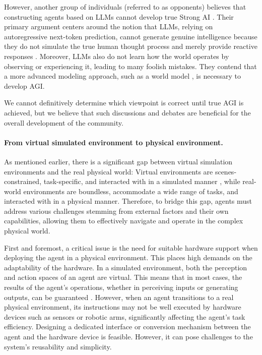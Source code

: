 However, another group of individuals (referred to as opponents) believes that constructing agents based on LLMs cannot develop true Strong AI \cite{twitter_2}. 
Their primary argument centers around the notion that LLMs, relying on autoregressive next-token prediction, cannot generate genuine intelligence because they do not simulate the true human thought process and merely provide reactive responses \cite{blog_1}. 
Moreover, LLMs also do not learn how the world operates by observing or experiencing it, leading to many foolish mistakes. They contend that a more advanced modeling approach, such as a world model \cite{lecun2022path}, is necessary to develop AGI.

We cannot definitively determine which viewpoint is correct until true AGI is achieved, but we believe that such discussions and debates are beneficial for the overall development of the community.



\paragraph{From virtual simulated environment to physical environment.}
As mentioned earlier, there is a significant gap between virtual simulation environments and the real physical world: Virtual environments are scenes-constrained, task-specific, and interacted with in a simulated manner \cite{DBLP:journals/corr/abs-2307-13854, DBLP:conf/iclr/ShridharYCBTH21}, while real-world environments are boundless, accommodate a wide range of tasks, and interacted with in a physical manner. Therefore, to bridge this gap, agents must address various challenges stemming from external factors and their own capabilities, allowing them to effectively navigate and operate in the complex physical world.

First and foremost, a critical issue is the need for suitable hardware support when deploying the agent in a physical environment. This places high demands on the adaptability of the hardware. In a simulated environment, both the perception and action spaces of an agent are virtual. This means that in most cases, the results of the agent's operations, whether in perceiving inputs or generating outputs, can be guaranteed \cite{DBLP:journals/corr/abs-2308-01552}. However, when an agent transitions to a real physical environment, its instructions may not be well executed by hardware devices such as sensors or robotic arms, significantly affecting the agent's task efficiency. Designing a dedicated interface or conversion mechanism between the agent and the hardware device is feasible. However, it can pose challenges to the system's reusability and simplicity. 

